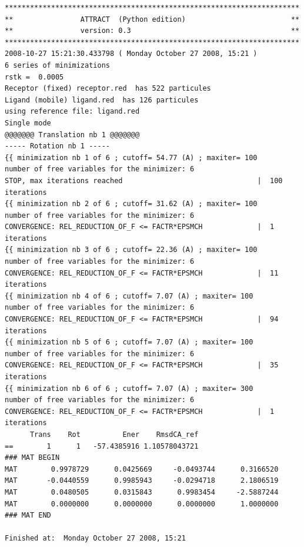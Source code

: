 \documentclass[12pt,a4paper]{article}
\begin{document}
\newpage
\linenumbers
\begin{verbatim}
**********************************************************************
**                ATTRACT  (Python edition)                         **
**                version: 0.3                                      **
********************************************************************** 
2008-10-27 15:21:30.433798 ( Monday October 27 2008, 15:21 )
6 series of minimizations
rstk =  0.0005
Receptor (fixed) receptor.red  has 522 particules
Ligand (mobile) ligand.red  has 126 particules
using reference file: ligand.red
Single mode
@@@@@@@ Translation nb 1 @@@@@@@
----- Rotation nb 1 -----
{{ minimization nb 1 of 6 ; cutoff= 54.77 (A) ; maxiter= 100
number of free variables for the minimizer: 6
STOP, max iterations reached                                |  100 iterations
{{ minimization nb 2 of 6 ; cutoff= 31.62 (A) ; maxiter= 100
number of free variables for the minimizer: 6
CONVERGENCE: REL_REDUCTION_OF_F <= FACTR*EPSMCH             |  1 iterations
{{ minimization nb 3 of 6 ; cutoff= 22.36 (A) ; maxiter= 100
number of free variables for the minimizer: 6
CONVERGENCE: REL_REDUCTION_OF_F <= FACTR*EPSMCH             |  11 iterations
{{ minimization nb 4 of 6 ; cutoff= 7.07 (A) ; maxiter= 100
number of free variables for the minimizer: 6
CONVERGENCE: REL_REDUCTION_OF_F <= FACTR*EPSMCH             |  94 iterations
{{ minimization nb 5 of 6 ; cutoff= 7.07 (A) ; maxiter= 100
number of free variables for the minimizer: 6
CONVERGENCE: REL_REDUCTION_OF_F <= FACTR*EPSMCH             |  35 iterations
{{ minimization nb 6 of 6 ; cutoff= 7.07 (A) ; maxiter= 300
number of free variables for the minimizer: 6
CONVERGENCE: REL_REDUCTION_OF_F <= FACTR*EPSMCH             |  1 iterations
      Trans    Rot          Ener    RmsdCA_ref
==        1      1   -57.4385916 1.10578043721
### MAT BEGIN
MAT        0.9978729      0.0425669     -0.0493744      0.3166520 
MAT       -0.0440559      0.9985943     -0.0294718      2.1806519 
MAT        0.0480505      0.0315843      0.9983454     -2.5887244 
MAT        0.0000000      0.0000000      0.0000000      1.0000000 
### MAT END

Finished at:  Monday October 27 2008, 15:21
\end{verbatim}
\nolinenumbers
\end{document}

